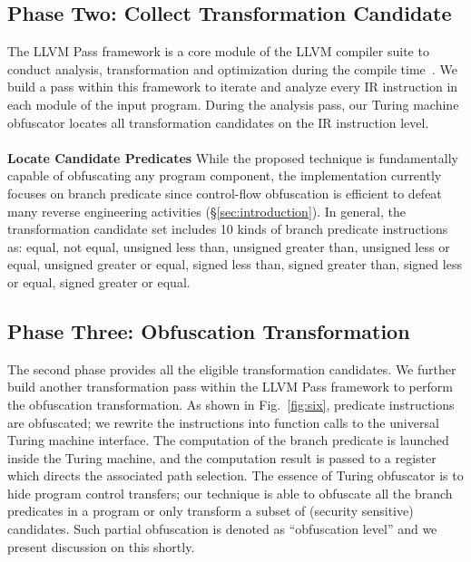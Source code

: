 \documentclass[lnicst]{svmultln}
\newcommand{\F}{Fig.}
\begin{document}
\subsection{Phase Two: Collect Transformation Candidate}
The LLVM Pass framework is a core module of the LLVM compiler suite to conduct
analysis, transformation and optimization during the compile
time~\cite{LLVM}. We build a pass within this framework to iterate and
analyze every IR instruction in each module of the input program. During the
analysis pass, our Turing machine obfuscator locates all transformation
candidates on the IR instruction level.
\\\\
\noindent \textbf{Locate Candidate Predicates} While the proposed technique is
fundamentally capable of obfuscating any program component, the implementation
currently focuses on branch predicate since control-flow obfuscation is
efficient to defeat many reverse engineering activities
(\S\ref{sec:introduction}). In general, the transformation candidate set
includes 10 kinds of branch predicate instructions as: equal, not equal,
unsigned less than, unsigned greater than, unsigned less or equal, unsigned
greater or equal, signed less than, signed greater than, signed less or equal,
signed greater or equal.

\subsection{Phase Three: Obfuscation Transformation}
\label{subsec:phase-three}
The second phase provides all the eligible transformation candidates. We further
build another transformation pass within the LLVM Pass framework to perform the
obfuscation transformation. As shown in \F~\ref{fig:six}, predicate instructions
are obfuscated; we rewrite the instructions into function calls to the universal
Turing machine interface. The computation of the branch predicate is launched
inside the Turing machine, and the computation result is passed to a register
which directs the associated path selection. The essence of Turing obfuscator is
to hide program control transfers; our technique is able to obfuscate all the
branch predicates in a program or only transform a subset of (security
sensitive) candidates. Such partial obfuscation is denoted as ``obfuscation
level'' and we present discussion on this shortly.
\end{document}
